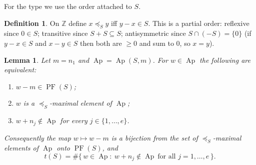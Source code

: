 \documentclass{amsart}
\newtheorem{lemma}{Lemma}
\theoremstyle{definition}
\newtheorem{definition}{Definition}
\DeclareMathOperator{\Ap}{Ap}
\DeclareMathOperator{\PF}{PF}
\newcommand{\ZZ}{\mathbb{Z}}
\begin{document}
For the type we use the order attached to $S$.

\begin{definition}\label{def:order}
On $\ZZ$ define $x\preceq_S y$ iff $y-x\in S$. This is a partial order:
reflexive since $0\in S$; transitive since $S+S\subseteq S$; antisymmetric
since $S\cap(-S)=\{0\}$ (if $y-x\in S$ and $x-y\in S$ then both are $\ge0$
and sum to $0$, so $x=y$).
\end{definition}

\begin{lemma}\label{lem:PFapery}
Let $m=n_1$ and $\Ap=\Ap(S,m)$. For $w\in\Ap$ the following are equivalent:
\begin{enumerate}
\item[(i)] $w-m\in\PF(S)$;
\item[(ii)] $w$ is a $\preceq_S$-maximal element of $\Ap$;
\item[(iii)] $w+n_j\notin\Ap$ for every $j\in\{1,\dots,e\}$.
\end{enumerate}
Consequently the map $w\mapsto w-m$ is a bijection from the set of
$\preceq_S$-maximal elements of $\Ap$ onto $\PF(S)$, and
\begin{equation}\label{eq:t}
t(S)=\#\bigl\{\,w\in\Ap:\ w+n_j\notin\Ap\ \text{for all }j=1,\dots,e\,\bigr\}.
\end{equation}
\end{lemma}
\end{document}
